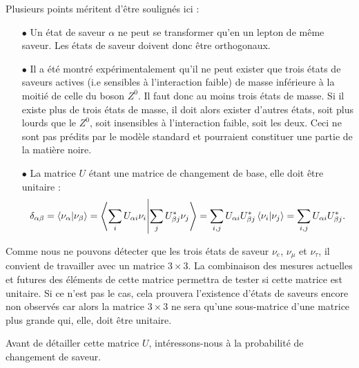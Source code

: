         Plusieurs points méritent d'être soulignés ici :
        \begin{itemize}
          \item[$\bullet$] Un état de saveur $\alpha$ ne peut se transformer qu'en un lepton de même saveur. Les états de saveur doivent donc être orthogonaux.
          \item[$\bullet$] Il a été montré expérimentalement qu'il ne peut exister que trois états de saveurs actives (i.e sensibles à l'interaction faible)\cite{pdg2018} de masse inférieure à la moitié de celle du boson $Z^0$. Il faut donc au moins trois états de masse. Si il existe plus de trois états de masse, il doit alors exister d'autres états, soit plus lourds que le $Z^0$, soit insensibles à l'interaction faible, soit les deux. Ceci ne sont pas prédits par le modèle standard et pourraient constituer une partie de la matière noire.
          \item[$\bullet$] La matrice $U$ étant une matrice de changement de base, elle doit être unitaire :
          \begin{equation*}
            \delta_{\alpha\beta} = \braket{\nu_{\alpha}}{\nu_{\beta}} = \braket{\sum_i U_{\alpha i}\nu_i}{\sum_j U_{\beta j}^*\nu_j} = \sum_{i,j} U_{\alpha i}U_{\beta j}^* \braket{\nu_i}{\nu_j} = \sum_{i,j} U_{\alpha i}U_{\beta j}^*.
          \end{equation*}
        \end{itemize}
        Comme nous ne pouvons détecter que les trois états de saveur $\nu_e$, $\nu_{\mu}$ et $\nu_{\tau}$, il convient de travailler avec un matrice $3\times3$. La combinaison des mesures actuelles et futures des éléments de cette matrice\cite{Qian2013} permettra de tester si cette matrice est unitaire. Si ce n'est pas le cas, cela prouvera l'existence d'états de saveurs encore non observés car alors la matrice $3\times3$ ne sera qu'une sous-matrice d'une matrice plus grande qui, elle, doit être unitaire.
        
        Avant de détailler cette matrice $U$, intéressons-nous à la probabilité de changement de saveur.

